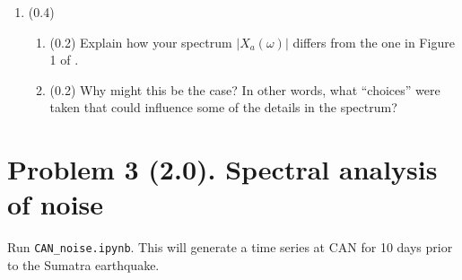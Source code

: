 \documentclass[11pt,titlepage,fleqn]{article}
\newcommand{\tfilenoise}{{\tt CAN\_noise.ipynb}}
\begin{document}
\begin{enumerate}

\item (0.4) \ptag\ 
%
\begin{enumerate}
\item (0.2) Explain how your spectrum $|X_a(\omega)|$ differs from the one in Figure 1 of \citet{Park2005}.
\item (0.2) Why might this be the case? In other words, what ``choices'' were taken that could influence some of the details in the spectrum?
\end{enumerate}

\end{enumerate}


\pagebreak
\section*{Problem 3 (2.0). Spectral analysis of noise}

Run \tfilenoise. This will generate a time series at CAN for 10 days prior to the Sumatra earthquake.
\end{document}
